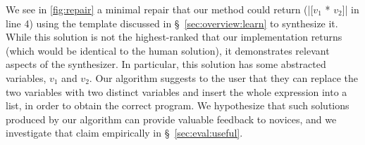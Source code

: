  We see in \autoref{fig:repair} a minimal repair that our method
could return (|[$v_1$ * $v_2$]| in line 4) using the template discussed in
\S~\ref{sec:overview:learn} to synthesize it. While this solution is not the
highest-ranked that our implementation returns (which would be identical to the
human solution), it demonstrates relevant aspects of the synthesizer. In
particular, this solution has some abstracted variables, $v_1$ and $v_2$. Our
algorithm suggests to the user that they can replace the two variables with two
distinct variables and insert the whole expression into a list, in order to
obtain the correct program. We hypothesize that such solutions produced by our
algorithm can provide valuable feedback to novices, and we investigate that
claim empirically in \S~\ref{sec:eval:useful}.
